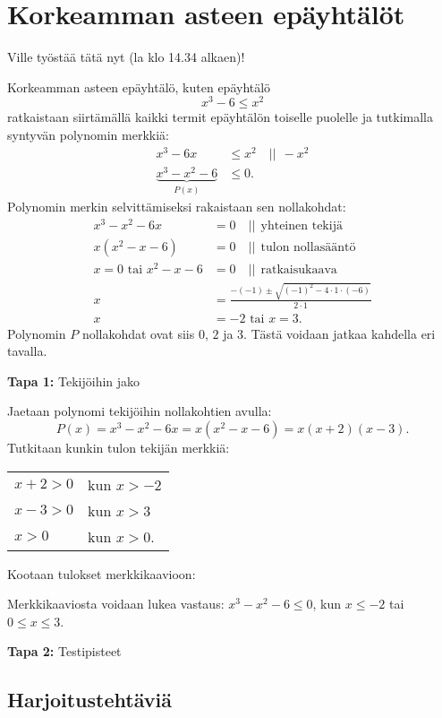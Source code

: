 \chapter{Korkeamman asteen epäyhtälöt}

Ville työstää tätä nyt (la klo 14.34 alkaen)!

Korkeamman asteen epäyhtälö, kuten epäyhtälö 
$$x^3 -6 \leq x^2 $$
ratkaistaan siirtämällä kaikki termit epäyhtälön toiselle puolelle ja tutkimalla
syntyvän polynomin merkkiä:
\begin{align*}
x^3 -6x &\leq x^2 \quad || \ \ -x^2 \\
\underbrace{x^3-x^2 -6}_{P(x)} &\leq 0.
\end{align*}
Polynomin merkin selvittämiseksi rakaistaan sen nollakohdat:
\begin{align*}
x^3 - x^2-6x &= 0 \quad || \ \ \textrm{yhteinen tekijä} \\
x(x^2 -x -6) &= 0 \quad || \ \ \textrm{tulon nollasääntö} \\
x = 0 \textrm{ tai } x^2 -x -6 &= 0 \quad|| \ \ \textrm{ratkaisukaava} \\
x &=\frac{-(-1) \pm \sqrt{(-1)^2-4\cdot 1 \cdot (-6)}}{2\cdot 1} \\
x &= -2 \textrm{ tai } x = 3.
\end{align*}
Polynomin $P$ nollakohdat ovat siis $0$, $2$ ja $3$. Tästä voidaan jatkaa kahdella eri tavalla.

\textbf{Tapa 1:} Tekijöihin jako

Jaetaan polynomi tekijöihin nollakohtien avulla: 
$$P(x) = x^3 - x^2-6x = x(x^2-x-6) = x(x+2)(x-3).$$
Tutkitaan kunkin tulon tekijän merkkiä:\\
\begin{tabular}{ll} 
$x+2>0$ & kun $x > -2$\\
$x-3>0$ & kun $x > 3$\\
$x>0$ & kun $x > 0$.
\end{tabular}
Kootaan tulokset merkkikaavioon:


Merkkikaaviosta voidaan lukea vastaus: $x^3-x^2 -6 \leq 0$, kun
$x\leq -2$ tai $0\leq x \leq 3$.

\textbf{Tapa 2:} Testipisteet

\section{Harjoitustehtäviä}
